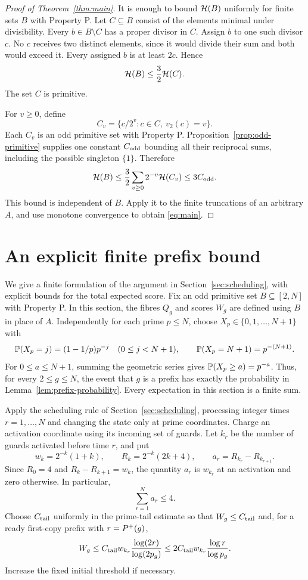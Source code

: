 \begin{proof}[Proof of Theorem~\ref{thm:main}]
It is enough to bound \(\mathcal H(B)\) uniformly for finite
sets \(B\) with Property P. Let \(C\subseteq B\) consist
of the elements minimal under divisibility.
Every \(b\in B\setminus C\) has a proper divisor in \(C\).
Assign \(b\) to one such divisor \(c\).
No \(c\) receives two distinct elements, since it
would divide their sum and both would exceed it.
Every assigned \(b\) is at least \(2c\). Hence
\begin{equation}\label{eq:primitive-reduction}
 \mathcal H(B)\le\frac32\mathcal H(C).
\end{equation}
The set \(C\) is primitive.

For \(v\ge0\), define
\[
 C_v=\{c/2^v:c\in C,\ v_2(c)=v\}.
\]
Each \(C_v\) is an odd primitive set with Property P.
Proposition~\ref{prop:odd-primitive} supplies one constant
\(C_{\rm odd}\) bounding all their reciprocal sums,
including the possible singleton \(\{1\}\).
Therefore
\[
 \mathcal H(B)\le\frac32\sum_{v\ge0}2^{-v}\mathcal H(C_v)
                \le3C_{\rm odd}.
\]
This bound is independent of \(B\). Apply it to the
finite truncations of an arbitrary \(A\), and use
monotone convergence to obtain \eqref{eq:main}.
\end{proof}

\section{An explicit finite prefix bound}\label{sec:finite-prefix}

We give a finite formulation of the argument in
Section~\ref{sec:scheduling}, with explicit bounds for the total expected
score. Fix an odd primitive set \(B\subseteq[2,N]\) with Property P.
In this section, the fibres \(Q_g\) and scores \(W_g\) are defined using
\(B\) in place of \(A\). Independently for each prime \(p\le N\), choose
\(X_p\in\{0,1,\ldots,N+1\}\) with
\[
 \mathbb P(X_p=j)=(1-1/p)p^{-j}\quad(0\le j<N+1),\qquad
 \mathbb P(X_p=N+1)=p^{-(N+1)}.
\]
For \(0\le a\le N+1\), summing the geometric series gives
\(\mathbb P(X_p\ge a)=p^{-a}\). Thus, for every \(2\le g\le N\), the event
that \(g\) is a prefix has exactly the probability in
Lemma~\ref{lem:prefix-probability}. Every expectation in this section is
a finite sum.

Apply the scheduling rule of Section~\ref{sec:scheduling}, processing
integer times \(r=1,\ldots,N\) and changing the state only at prime
coordinates. Charge an activation coordinate using its incoming set
of guards. Let \(k_r\) be the number of guards activated before time
\(r\), and put
\[
 w_k=2^{-k}(1+k),\qquad R_k=2^{-k}(2k+4),\qquad
 a_r=R_{k_r}-R_{k_{r+1}}.
\]
Since \(R_0=4\) and \(R_k-R_{k+1}=w_k\), the quantity \(a_r\) is
\(w_{k_r}\) at an activation and zero otherwise. In particular,
\begin{equation}\label{eq:finite-activation}
 \sum_{r=1}^N a_r\le4.
\end{equation}
Choose \(C_{\rm tail}\) uniformly in the prime-tail estimate so that
\(W_g\le C_{\rm tail}\) and, for a ready first-copy prefix with
\(r=P^{+}(g)\),
\[
 W_g\le C_{\rm tail}w_{k_r}
       \frac{\log(2r)}{\log(2p_g)}
 \le 2C_{\rm tail}w_{k_r}\frac{\log r}{\log p_g}.
\]
Increase the fixed initial threshold if necessary.

